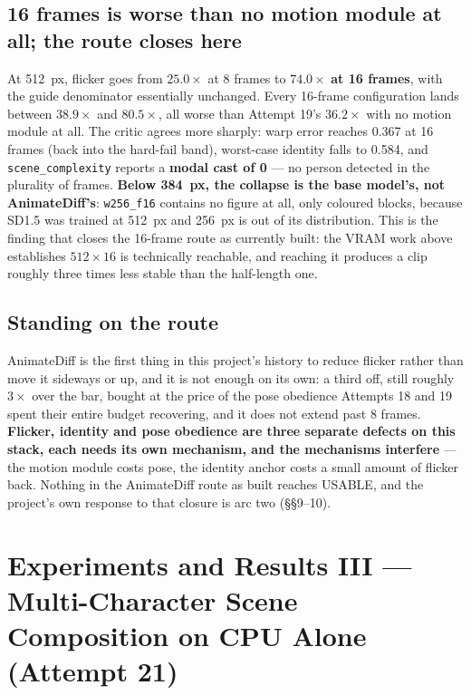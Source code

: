 \documentclass[11pt]{article}
\newcommand{\secsym}{\S}
\begin{document}
\subsection{16 frames is worse than no motion module at all; the route closes here}
\label{sec:16frames}

At 512~px, flicker goes from $25.0\times$ at 8 frames to
$\mathbf{74.0\times}$ \textbf{at 16 frames}, with the guide denominator
essentially unchanged. Every 16-frame configuration lands between
$38.9\times$ and $80.5\times$, all worse than Attempt 19's $36.2\times$
with no motion module at all. The critic agrees more sharply: warp error
reaches 0.367 at 16 frames (back into the hard-fail band), worst-case
identity falls to 0.584, and \texttt{scene\_complexity} reports a
\textbf{modal cast of 0} --- no person detected in the plurality of
frames. \textbf{Below 384~px, the collapse is the base model's, not
AnimateDiff's}: \texttt{w256\_f16} contains no figure at all, only
coloured blocks, because SD1.5 was trained at 512~px and 256~px is out of
its distribution. This is the finding that closes the 16-frame route as
currently built: the VRAM work above establishes $512\times16$ is
technically reachable, and reaching it produces a clip roughly three
times less stable than the half-length one.

\subsection{Standing on the route}
\label{sec:standingroute-a20}

AnimateDiff is the first thing in this project's history to reduce
flicker rather than move it sideways or up, and it is not enough on its
own: a third off, still roughly $3\times$ over the bar, bought at the
price of the pose obedience Attempts 18 and 19 spent their entire budget
recovering, and it does not extend past 8 frames. \textbf{Flicker,
identity and pose obedience are three separate defects on this stack,
each needs its own mechanism, and the mechanisms interfere} --- the motion
module costs pose, the identity anchor costs a small amount of flicker
back. Nothing in the AnimateDiff route as built reaches USABLE, and the
project's own response to that closure is arc two (\secsym\secsym9--10).

\section{Experiments and Results III --- Multi-Character Scene Composition on CPU Alone (Attempt 21)}
\label{sec:results3}
\end{document}
